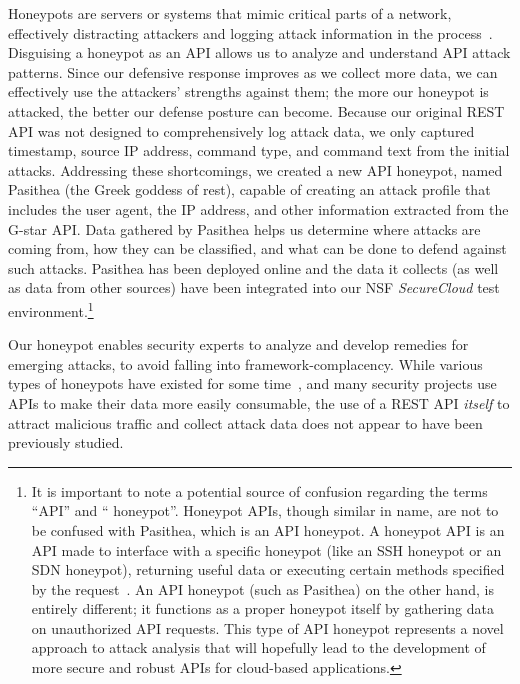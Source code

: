 Honeypots are servers or systems that mimic critical parts of a network, effectively distracting attackers and logging attack information in the process~\cite{honeypot-Def}.
Disguising a honeypot as an API allows us to analyze and understand API attack patterns.
Since our defensive response improves as we collect more data, we can effectively use the attackers' strengths against them; the more our honeypot is attacked, the better our defense posture can become.
Because our original REST API was not designed to comprehensively log attack data, we only captured timestamp, source IP address, command type, and command text from the initial attacks.  
Addressing these shortcomings, we created a new API honeypot, named Pasithea (the Greek goddess of rest), capable of creating an attack profile that includes the user agent, the IP address, and other information extracted from the G-star API.
Data gathered by Pasithea helps us determine where attacks are coming from, how they can be classified, and what can be done to defend against such attacks.  
Pasithea has been deployed online and the data it collects (as well as data from other sources) have been integrated into our NSF {\em SecureCloud} test environment.\footnote{  
It is important to note a potential source of confusion regarding the terms ``API'' and `` honeypot''. 
Honeypot APIs, though similar in name, are not to be confused with Pasithea, which is an API honeypot. 
A honeypot API is an API made to interface with a specific honeypot (like an SSH honeypot or an SDN honeypot), returning useful data or executing certain methods specified by the request~\cite{Honeypot-API}. 
An API honeypot (such as Pasithea) on the other hand, is entirely different; it functions as a proper honeypot itself by gathering data on unauthorized API requests.  
This type of API honeypot represents a novel approach to attack analysis that will hopefully lead to the development of more secure and robust APIs for cloud-based applications.}  

Our honeypot enables security experts to analyze and develop remedies for emerging attacks, to avoid falling into framework-complacency.  
While various types of honeypots have existed for some time~\cite{Stoll:1989:CET:67554,Provos:2004:VHF:1251375.1251376}, and many security projects use APIs to make their data more easily consumable,
the use of a REST API {\em itself} to attract malicious traffic and collect attack data does not appear to have been previously studied.

